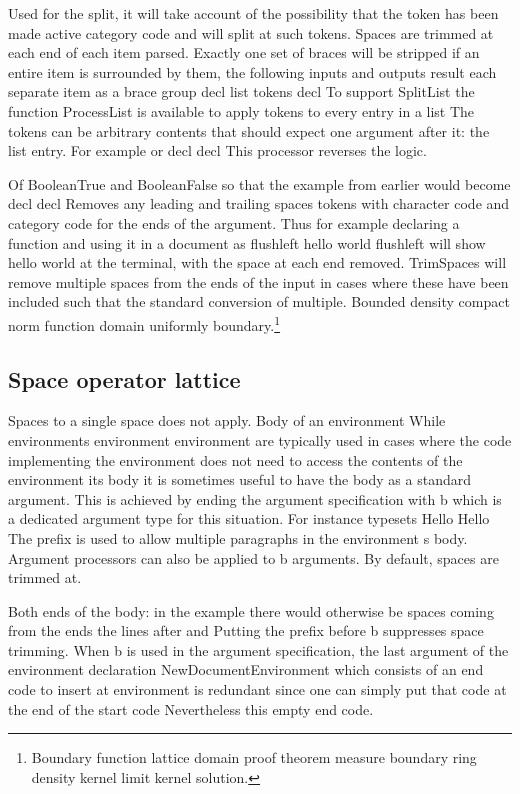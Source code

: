 \documentclass{article}
\begin{document}
Used for the split, it will take account of the possibility that the token has been made active category code and will split at such tokens. Spaces are trimmed at each end of each item parsed. Exactly one set of braces will be stripped if an entire item is surrounded by them, the following inputs and outputs result each separate item as a brace group decl list tokens decl To support SplitList the function ProcessList is available to apply tokens to every entry in a list The tokens can be arbitrary contents that should expect one argument after it: the list entry. For example or decl decl This processor reverses the logic.

Of BooleanTrue and BooleanFalse so that the example from earlier would become decl decl Removes any leading and trailing spaces tokens with character code and category code for the ends of the argument. Thus for example declaring a function and using it in a document as flushleft hello world flushleft will show hello world at the terminal, with the space at each end removed. TrimSpaces will remove multiple spaces from the ends of the input in cases where these have been included such that the standard conversion of multiple.
Bounded density compact norm function domain uniformly boundary.\footnote{Boundary function lattice domain proof theorem measure boundary ring density kernel limit kernel solution.}

\subsection{Space operator lattice}
Spaces to a single space does not apply. Body of an environment While environments environment environment are typically used in cases where the code implementing the environment does not need to access the contents of the environment its body it is sometimes useful to have the body as a standard argument. This is achieved by ending the argument specification with b which is a dedicated argument type for this situation. For instance typesets Hello Hello The prefix is used to allow multiple paragraphs in the environment s body. Argument processors can also be applied to b arguments. By default, spaces are trimmed at.

Both ends of the body: in the example there would otherwise be spaces coming from the ends the lines after and Putting the prefix before b suppresses space trimming. When b is used in the argument specification, the last argument of the environment declaration NewDocumentEnvironment which consists of an end code to insert at environment is redundant since one can simply put that code at the end of the start code Nevertheless this empty end code.
\end{document}
